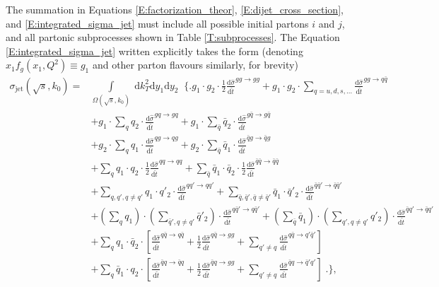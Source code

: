 \documentclass[a4paper, twoside, english, 12pt]{report}
\begin{document}
The summation in Equations \eqref{E:factorization_theor}, \eqref{E:dijet_cross_section}, and \eqref{E:integrated_sigma_jet} must include all possible initial partons $i$ and $j$, and all partonic subprocesses shown in Table \ref{T:subprocesses}. The Equation \eqref{E:integrated_sigma_jet} written explicitly takes the form (denoting $x_1f_g(x_1,Q^2)\equiv g_1$ and other parton flavours similarly, for brevity)
\begin{align}\label{E:partonic_bookkeeping}
\sigma_{\text{jet}}(\sqrt{s},k_0) = &\int\limits_{\Omega(\sqrt{s},k_0)}\;\text{d}k_T^2\text{d}y_1\text{d}y_2\; \;  \Bigg\{\Bigg. g_1\cdot g_2 \cdot \frac{1}{2}\frac{\text{d}\hat{\sigma}}{\text{d}\hat{t}}^{gg\rightarrow gg} + g_1\cdot g_2 \cdot \sum\limits_{q=u,d,s,\dots}\frac{\text{d}\hat{\sigma}}{\text{d}\hat{t}}^{gg\rightarrow q\bar{q}}  \nonumber\\[0.5em]
&+g_1\cdot \sum\limits_{q}q_2 \cdot \frac{\text{d}\hat{\sigma}}{\text{d}\hat{t}}^{gq\rightarrow gq} + g_1\cdot \sum\limits_{\bar{q}}\bar{q}_2 \cdot \frac{\text{d}\hat{\sigma}}{\text{d}\hat{t}}^{g\bar{q}\rightarrow g\bar{q}} \nonumber\\
&+g_2\cdot \sum\limits_{q}q_1 \cdot \frac{\text{d}\hat{\sigma}}{\text{d}\hat{t}}^{qg\rightarrow qg} + g_2\cdot \sum\limits_{\bar{q}}\bar{q}_1 \cdot \frac{\text{d}\hat{\sigma}}{\text{d}\hat{t}}^{\bar{q}g\rightarrow \bar{q}g} \nonumber\\[0.5em]
&+\sum\limits_{q} q_1\cdot q_2 \cdot \frac{1}{2}\frac{\text{d}\hat{\sigma}}{\text{d}\hat{t}}^{qq\rightarrow qq} + \sum\limits_{\bar{q}} \bar{q}_1\cdot \bar{q}_2 \cdot \frac{1}{2}\frac{\text{d}\hat{\sigma}}{\text{d}\hat{t}}^{\bar{q}\bar{q}\rightarrow \bar{q}\bar{q}} \nonumber\\[0.75em]
&+\sum\limits_{q, q', q\neq q'} q_1\cdot q'_2 \cdot \frac{\text{d}\hat{\sigma}}{\text{d}\hat{t}}^{qq'\rightarrow qq'} + \sum\limits_{\bar{q}, \bar{q}', \bar{q}\neq\bar{q}'} \bar{q}_1\cdot \bar{q}'_2 \cdot \frac{\text{d}\hat{\sigma}}{\text{d}\hat{t}}^{\bar{q}\bar{q}'\rightarrow \bar{q}\bar{q}'} \nonumber\\[0.15em]
&+\left(\sum\limits_{q} q_1\right)\cdot \left(\sum\limits_{\bar{q}', q\neq q'}\bar{q}'_2\right) \cdot \frac{\text{d}\hat{\sigma}}{\text{d}\hat{t}}^{q\bar{q}'\rightarrow q\bar{q}'} + \left(\sum\limits_{\bar{q}} \bar{q}_1\right)\cdot \left(\sum\limits_{q', q\neq q'}q'_2\right) \cdot \frac{\text{d}\hat{\sigma}}{\text{d}\hat{t}}^{\bar{q}q'\rightarrow \bar{q}q'} \nonumber\\[1em]
&+\sum\limits_{q} q_1\cdot \bar{q}_2 \cdot \left[\frac{\text{d}\hat{\sigma}}{\text{d}\hat{t}}^{q\bar{q}\rightarrow q\bar{q}} + \frac{1}{2}\frac{\text{d}\hat{\sigma}}{\text{d}\hat{t}}^{q\bar{q}\rightarrow gg} +\sum\limits_{q'\neq q}\frac{\text{d}\hat{\sigma}}{\text{d}\hat{t}}^{q\bar{q}\rightarrow q'\bar{q}'} \right] \nonumber\\[0.15em]
&+\sum\limits_{q} \bar{q}_1\cdot q_2 \cdot \left[\frac{\text{d}\hat{\sigma}}{\text{d}\hat{t}}^{\bar{q}q\rightarrow \bar{q}q} + \frac{1}{2}\frac{\text{d}\hat{\sigma}}{\text{d}\hat{t}}^{\bar{q}q\rightarrow gg} +\sum\limits_{q'\neq q}\frac{\text{d}\hat{\sigma}}{\text{d}\hat{t}}^{\bar{q}q\rightarrow \bar{q}'q'} \right]\;\Bigg.\Bigg\},
\end{align}
\end{document}
